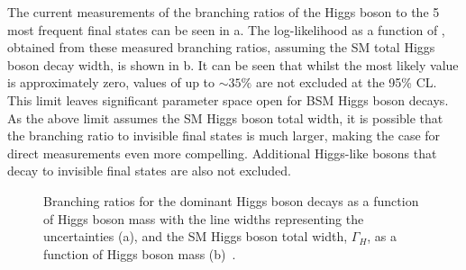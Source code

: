 The current measurements of the branching ratios of the Higgs boson to the 5 most frequent final states can be seen in a. The log-likelihood as a function of \BRinv, obtained from these measured branching ratios, assuming the \ac{SM} total Higgs boson decay width, is shown in b. It can be seen that whilst the most likely value is approximately zero, values of \BRinv up to $\sim35\%$ are not excluded at the 95\% \ac{CL}. This limit leaves significant parameter space open for \ac{BSM} Higgs boson decays. As the above limit assumes the \ac{SM} Higgs boson total width, it is possible that the branching ratio to invisible final states is much larger, making the case for direct measurements even more compelling. Additional Higgs-like bosons that decay to invisible final states are also not excluded.


\begin{figure}
  \caption[Branching ratios for the dominant Higgs boson decays as a function of Higgs boson mass with the line widths representing the uncertainties (a), and the SM Higgs boson total width, $\Gamma_{H}$, as a function of Higgs boson mass (b).]{Branching ratios for the dominant Higgs boson decays as a function of Higgs boson mass with the line widths representing the uncertainties (a), and the SM Higgs boson total width, $\Gamma_{H}$, as a function of Higgs boson mass (b)~\cite{Heinemeyer:1559921}.}
  \label{fig:smdecay}
\end{figure}

